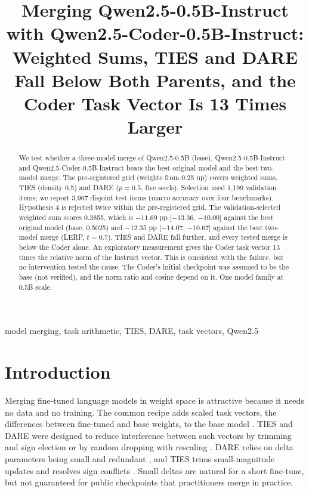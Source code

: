\documentclass[conference]{IEEEtran}
\begin{document}
\title{Merging Qwen2.5-0.5B-Instruct with Qwen2.5-Coder-0.5B-Instruct: Weighted Sums, TIES and DARE Fall Below Both Parents, and the Coder Task Vector Is 13 Times Larger}

\author{
}

\maketitle

\begin{abstract}
We test whether a three-model merge of Qwen2.5-0.5B (base), Qwen2.5-0.5B-Instruct and Qwen2.5-Coder-0.5B-Instruct beats the best original model and the best two-model merge. The pre-registered grid (weights from 0.25 up) covers weighted sums, TIES (density 0.5) and DARE ($p=0.5$, five seeds). Selection used 1{,}199 validation items; we report 3{,}967 disjoint test items (macro accuracy over four benchmarks). Hypothesis 4 is rejected twice within the pre-registered grid. The validation-selected weighted sum scores 0.3855, which is $-11.69$ pp [$-13.36$, $-10.00$] against the best original model (base, 0.5025) and $-12.35$ pp [$-14.07$, $-10.67$] against the best two-model merge (LERP, $t=0.7$). TIES and DARE fall further, and every tested merge is below the Coder alone. An exploratory measurement gives the Coder task vector 13 times the relative norm of the Instruct vector. This is consistent with the failure, but no intervention tested the cause. The Coder's initial checkpoint was assumed to be the base (not verified), and the norm ratio and cosine depend on it. One model family at 0.5B scale.
\end{abstract}

\begin{IEEEkeywords}
model merging, task arithmetic, TIES, DARE, task vectors, Qwen2.5
\end{IEEEkeywords}

\section{Introduction}
Merging fine-tuned language models in weight space is attractive because it needs no data and no training. The common recipe adds scaled task vectors, the differences between fine-tuned and base weights, to the base model \cite{ilharco2022editing}. TIES and DARE were designed to reduce interference between such vectors by trimming and sign election \cite{yadav2023ties} or by random dropping with rescaling \cite{yu2023dare}. DARE relies on delta parameters being small and redundant \cite{yu2023dare}, and TIES trims small-magnitude updates and resolves sign conflicts \cite{yadav2023ties}. Small deltas are natural for a short fine-tune, but not guaranteed for public checkpoints that practitioners merge in practice.
\end{document}
